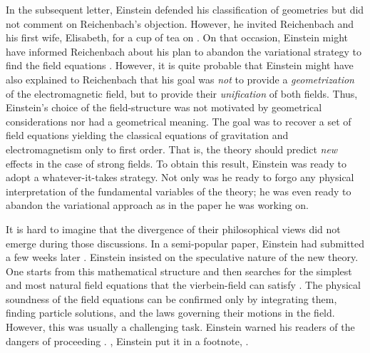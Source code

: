 \documentclass[final]{article}
\newcommand{\vbein}{vierbein\xspace}
\begin{document}
In the subsequent letter, Einstein defended his classification of geometries but did not comment on Reichenbach's objection. However, he invited Reichenbach and his first wife, Elisabeth, for a cup of tea on . On that occasion, Einstein might have informed Reichenbach about his plan to abandon the variational strategy to find the field equations \citep{Sauer2006}. However, it is quite probable that Einstein might have also explained to Reichenbach that his goal was \emph{not} to provide a \emph{geometrization} of the electromagnetic field, but to provide their \emph{unification} of both fields. Thus, Einstein's choice of the field-structure was not motivated by geometrical considerations nor had a geometrical meaning. The goal was to recover a set of field equations yielding the classical equations of gravitation and electromagnetism only to first order. That is, the theory should predict \emph{new} effects in the case of strong fields. To obtain this result, Einstein was ready to adopt a whatever-it-takes strategy. Not only was he ready to forgo any physical interpretation of the fundamental variables of the theory; he was even ready to abandon the variational approach as in the paper he was working on. 

It is hard to imagine that the divergence of their philosophical views did not emerge during those discussions. In a semi-popular paper, Einstein had submitted a few weeks later \citep[131]{Einstein1929}. Einstein insisted on the speculative nature of the new theory. One starts from this mathematical structure and then searches for the simplest and most natural field equations that the \vbein-field can satisfy \citep[131]{Einstein1929}. The physical soundness of the field equations can be confirmed only by integrating them, finding particle solutions, and the laws governing their motions in the field. However, this was usually a challenging task. Einstein warned his readers of the dangers of proceeding  \citep[127]{Einstein1929}. , Einstein put it in a footnote,  \citep[127]{Einstein1929}.
\end{document}
